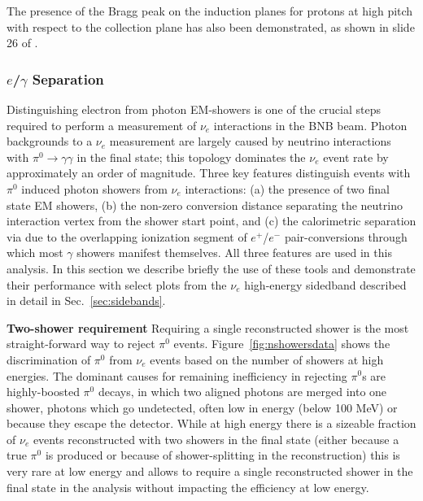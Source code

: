 The presence of the Bragg peak on the induction planes for protons at high pitch with respect to the collection plane has also been demonstrated, as shown in slide 26 of \cite{bib:calorimetry_collab_meeting}.

\subsubsection{$e$/$\gamma$ Separation}
\label{subsec:egammaspearation}


\par Distinguishing electron from photon EM-showers is one of the crucial steps required to perform a measurement of $\nu_e$ interactions in the BNB beam. Photon backgrounds to a $\nu_e$ measurement are largely caused by neutrino interactions with $\pi^0 \rightarrow \gamma\gamma$ in the final state; this topology dominates the $\nu_e$ event rate by approximately an order of magnitude. Three key features distinguish events with $\pi^0$ induced photon showers from $\nu_e$ interactions: (a) the presence of two final state EM showers, (b) the non-zero conversion distance separating the neutrino interaction vertex from the shower start point, and (c) the calorimetric separation via \dedx due to the overlapping ionization segment of $e^+$/$e^-$ pair-conversions through which most $\gamma$ showers manifest themselves. All three features are used in this analysis. In this section we describe briefly the use of these tools and demonstrate their performance with select plots from the $\nu_e$ high-energy sidedband described in detail in Sec.~\ref{sec:sidebands}.

\par \textbf{Two-shower requirement} Requiring a single reconstructed shower is the most straight-forward way to reject $\pi^0$ events. Figure~\ref{fig:nshowersdata} shows the discrimination of $\pi^0$ from $\nu_e$ events based on the number of showers at high energies. The dominant causes for remaining inefficiency in rejecting $\pi^0$s are highly-boosted $\pi^0$ decays, in which two aligned photons are merged into one shower, photons which go undetected, often low in energy (below 100 MeV) or because they escape the detector. While at high energy there is a sizeable fraction of $\nu_e$ events reconstructed with two showers in the final state (either because a true $\pi^0$ is produced or because of shower-splitting in the reconstruction) this is very rare at low energy and allows to require a single reconstructed shower in the final state in the analysis without impacting the efficiency at low energy.

